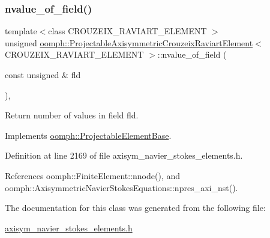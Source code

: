 \subsubsection{\texorpdfstring{nvalue\+\_\+of\+\_\+field()}{nvalue\_of\_field()}}
{\footnotesize\ttfamily template$<$class C\+R\+O\+U\+Z\+E\+I\+X\+\_\+\+R\+A\+V\+I\+A\+R\+T\+\_\+\+E\+L\+E\+M\+E\+NT $>$ \\
unsigned \hyperlink{classoomph_1_1ProjectableAxisymmetricCrouzeixRaviartElement}{oomph\+::\+Projectable\+Axisymmetric\+Crouzeix\+Raviart\+Element}$<$ C\+R\+O\+U\+Z\+E\+I\+X\+\_\+\+R\+A\+V\+I\+A\+R\+T\+\_\+\+E\+L\+E\+M\+E\+NT $>$\+::nvalue\+\_\+of\+\_\+field (\begin{DoxyParamCaption}\item[{const unsigned \&}]{fld }\end{DoxyParamCaption})\hspace{0.3cm}{\ttfamily [inline]}, {\ttfamily [virtual]}}



Return number of values in field fld. 



Implements \hyperlink{classoomph_1_1ProjectableElementBase_a1a9a6de16f3511bca8e8be770abb9c2e}{oomph\+::\+Projectable\+Element\+Base}.



Definition at line 2169 of file axisym\+\_\+navier\+\_\+stokes\+\_\+elements.\+h.



References oomph\+::\+Finite\+Element\+::nnode(), and oomph\+::\+Axisymmetric\+Navier\+Stokes\+Equations\+::npres\+\_\+axi\+\_\+nst().



The documentation for this class was generated from the following file\+:\begin{DoxyCompactItemize}
\item 
\hyperlink{axisym__navier__stokes__elements_8h}{axisym\+\_\+navier\+\_\+stokes\+\_\+elements.\+h}\end{DoxyCompactItemize}
